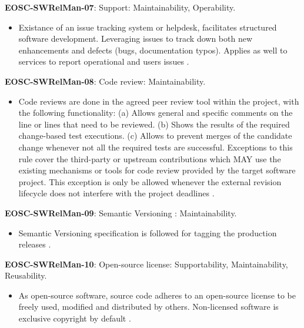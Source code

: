 \textbf{EOSC-SWRelMan-07}: Support: Maintainability, Operability.

\begin{itemize}
    \item Existance of an issue tracking system or helpdesk, facilitates structured software development. Leveraging issues to track down both new enhancements and defects (bugs, documentation typos). Applies as well to services to report operational and users issues \cite{srisopha_software_2018,shepherdson_cessda_2019,orviz_set_2017,orviz_fernandez_eosc-synergy_2020}.
\end{itemize}

\textbf{EOSC-SWRelMan-08}: Code review: Maintainability.

\begin{itemize}
    \item Code reviews are done in the agreed peer review tool within the project, with the following  functionality: (a) Allows general and specific comments on the line or lines that need to be reviewed. (b) Shows the results of the required change-based test executions. (c) Allows to prevent merges of the candidate change whenever not all the required tests are successful. Exceptions to this rule cover the third-party or upstream contributions which MAY use the existing mechanisms or tools for code review provided by the target software project. This exception is only be allowed whenever the external revision lifecycle does not interfere with the project deadlines \cite{srisopha_software_2018,aberdour_achieving_2007,zuser_software_2005,orviz_set_2017}.
\end{itemize}

\textbf{EOSC-SWRelMan-09}: Semantic Versioning : Maintainability.

\begin{itemize}
    \item Semantic Versioning specification is followed for tagging the production releases \cite{orviz_set_2017,raymond_software_2013}.
\end{itemize}

\textbf{EOSC-SWRelMan-10}: Open-source license: Supportability, Maintainability, Reusability.

\begin{itemize}
    \item As open-source software, source code adheres to an open-source license to be freely used, modified and distributed by others. Non-licensed software is exclusive copyright by default \cite{orviz_set_2017,raymond_software_2013}.
\end{itemize}

